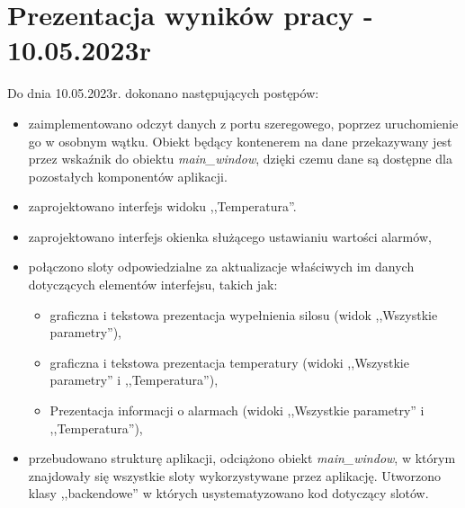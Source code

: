 \section{Prezentacja wyników pracy - 10.05.2023r}
    Do dnia 10.05.2023r. dokonano następujących postępów:
        \begin{itemize}
            \item zaimplementowano odczyt danych z portu szeregowego, poprzez uruchomienie go w osobnym wątku. 
                Obiekt będący kontenerem na dane przekazywany jest przez wskaźnik do obiektu \textit{main\_window}, dzięki
                czemu dane są dostępne dla pozostałych komponentów aplikacji.
            \item zaprojektowano interfejs widoku ,,Temperatura''.
            \item zaprojektowano interfejs okienka służącego ustawianiu wartości alarmów,
            \item połączono sloty odpowiedzialne za aktualizacje właściwych im danych dotyczących elementów interfejsu, takich jak:
                \begin{itemize}
                    \item graficzna i tekstowa  prezentacja wypełnienia silosu (widok ,,Wszystkie parametry''),
                    \item graficzna i tekstowa prezentacja temperatury (widoki ,,Wszystkie parametry'' i ,,Temperatura''),
                    \item Prezentacja informacji o alarmach  (widoki ,,Wszystkie parametry'' i ,,Temperatura''),
                \end{itemize}
            \item przebudowano strukturę aplikacji, odciążono obiekt \textit{main\_window}, w którym znajdowały się 
                wszystkie sloty wykorzystywane przez aplikację. Utworzono klasy ,,backendowe'' w których usystematyzowano
                kod dotyczący  slotów.
        \end{itemize}